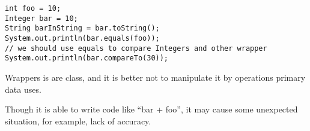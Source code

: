 \documentclass[en, 11pt, xcolor=dvipsnames]{beamer}
\begin{document}
\begin{frame}[fragile]
\begin{columns}[c]
\begin{column}{0.9\textwidth}
			\begin{lstlisting}[style=Java]
int foo = 10;
Integer bar = 10;
String barInString = bar.toString();
System.out.println(bar.equals(foo));
// we should use equals to compare Integers and other wrapper
System.out.println(bar.compareTo(30));\end{lstlisting}

			\tiny {
				Wrappers is are class, and it is better not to manipulate it by operations primary data uses.

				Though it is able to write code like ``bar + foo'',
				it may cause some unexpected situation, for example, lack of accuracy.
			}
		\end{column}
	\end{columns}


\end{frame}
\end{document}
